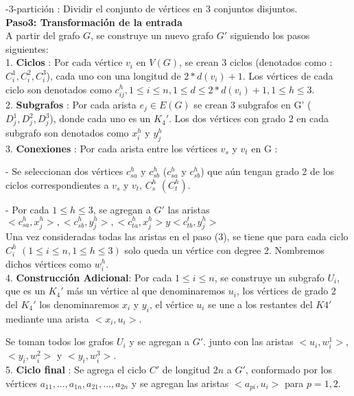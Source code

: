 \documentclass[
10pt, %
a4paper, %
oneside, %
headinclude,footinclude, %
BCOR5mm, %
]{scrartcl}
\begin{document}
-3-partición : Dividir el conjunto de vértices en 3 conjuntos disjuntos.\\



\textbf{Paso3: Transformación de la entrada  }\\

A partir del grafo $G$, se construye un nuevo grafo $G'$ siguiendo los pasos siguientes:\\

1. \textbf{Ciclos} : Por cada vértice $v_i$ en $V(G)$, se crean 3 ciclos (denotados como : $C^1_i, C^2_i, C^3_i$), 
cada uno con una longitud de $2*d(v_i) + 1$. Los vértices de cada ciclo son denotados como $c_{ij}^{h} , 1 \leq i \leq n , 1 \leq d \leq 2*d(v_i) + 1 , 1 \leq h \leq 3 $.\\

2. \textbf{Subgrafos} : Por cada arista $e_j \in E(G)$ se crean 3 subgrafos en G' ($D^1_j, D^2_j, D^3_j$), donde cada uno es un $K_4'$. Los dos vértices con grado 2 en cada 
subgrafo son denotados como $x^h_i$ y $y^h_j$\\

3. \textbf{Conexiones} : Por cada arista entre los vértices $v_s$ y $v_t$ en G :

- Se seleccionan dos vértices $c_{sa}^{h}$ y $c_{sb}^{h}$ ($c_{sa}^{h}$ y $c_{sb}^{h}$) que aún tengan grado 2 de los ciclos correspondientes a $v_s$ y $v_t$, $C^h_s$ $(C^h_t)$.

- Por cada $1\leq h \leq 3$, se agregan a $G'$ las aristas $<c_{sa}^{h},x^h_j> , <c_{sb}^{h},y^h_j> , <c_{ta}^{h},x^h_j>  y <c_{tb}^{t}, y^h_j >$\\

Una vez consideradas todas las aristas en
el paso (3), se tiene que para cada ciclo $C^h_i$ $( 1\leq i \leq n, 1 \leq h \leq 3 )$ solo queda un vértice con degree 2. Nombremos
dichos vértices como $w^h_i$.\\

4. \textbf{Construcción Adicional}: Por cada $1 \leq i \leq n$, se construye un subgrafo $U_i$, que es un $K_4'$ más un vértice al que denominaremos $u_i$, los vértices de grado 2 del $K_4'$ los denominaremos 
$x_i$ y $y_i$, el vértice $u_i$ se une a los restantes del $K4'$ mediante una arista $<x_i, u_i>$. 

Se toman todos los grafos $U_i$ y se agregan a $G'$. junto con las aristas $<u_i,w^1_i>$, $<y_i, w^2_i>$ y $<y_i, w^3_i>$.\\


5. \textbf{Ciclo final} : Se agrega el ciclo $C'$ de longitud $2n$ a $G'$, conformado por los vértices ${a_{11},..., a_{1n}, a_{21},..., a_{2n}}$ y se agregan las aristas $<a_{pi}, u_i>$ para $p = 1,2$.\\
\end{document}
